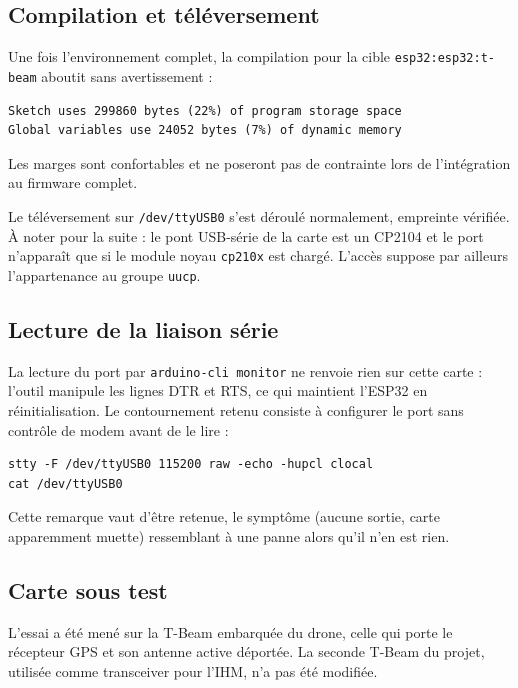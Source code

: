 \documentclass[11pt,a4paper]{article}
\newcommand{\code}[1]{\texttt{#1}}
\begin{document}
\subsection{Compilation et téléversement}

Une fois l'environnement complet, la compilation pour la cible
\code{esp32:esp32:t-beam} aboutit sans avertissement :

\begin{Verbatim}[fontsize=\footnotesize,frame=single,rulecolor=\color{gray},framesep=4pt]
Sketch uses 299860 bytes (22%) of program storage space
Global variables use 24052 bytes (7%) of dynamic memory
\end{Verbatim}

Les marges sont confortables et ne poseront pas de contrainte lors de
l'intégration au firmware complet.

Le téléversement sur \code{/dev/ttyUSB0} s'est déroulé normalement, empreinte
vérifiée. À noter pour la suite : le pont USB-série de la carte est un CP2104
et le port n'apparaît que si le module noyau \code{cp210x} est chargé. L'accès
suppose par ailleurs l'appartenance au groupe \code{uucp}.

\subsection{Lecture de la liaison série}

La lecture du port par \code{arduino-cli monitor} ne renvoie rien sur cette carte :
l'outil manipule les lignes DTR et RTS, ce qui maintient l'ESP32 en
réinitialisation. Le contournement retenu consiste à configurer le port sans
contrôle de modem avant de le lire :

\begin{Verbatim}[fontsize=\footnotesize,frame=single,rulecolor=\color{gray},framesep=4pt]
stty -F /dev/ttyUSB0 115200 raw -echo -hupcl clocal
cat /dev/ttyUSB0
\end{Verbatim}

Cette remarque vaut d'être retenue, le symptôme (aucune sortie, carte
apparemment muette) ressemblant à une panne alors qu'il n'en est rien.

\subsection{Carte sous test}

L'essai a été mené sur la T-Beam embarquée du drone, celle qui porte le
récepteur GPS et son antenne active déportée. La seconde T-Beam du projet,
utilisée comme transceiver pour l'IHM, n'a pas été modifiée.
\end{document}
